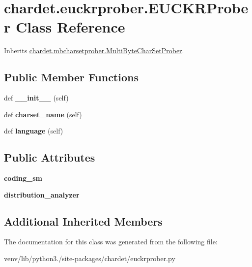 \hypertarget{classchardet_1_1euckrprober_1_1_e_u_c_k_r_prober}{}\section{chardet.\+euckrprober.\+E\+U\+C\+K\+R\+Prober Class Reference}
\label{classchardet_1_1euckrprober_1_1_e_u_c_k_r_prober}


Inherits \hyperlink{classchardet_1_1mbcharsetprober_1_1_multi_byte_char_set_prober}{chardet.\+mbcharsetprober.\+Multi\+Byte\+Char\+Set\+Prober}.

\subsection*{Public Member Functions}
\begin{DoxyCompactItemize}
\item 
\mbox{\label{classchardet_1_1euckrprober_1_1_e_u_c_k_r_prober_a06395787496827f7ba6ddada2690c4c9}} 
def {\bfseries \+\_\+\+\_\+init\+\_\+\+\_\+} (self)
\item 
\mbox{\label{classchardet_1_1euckrprober_1_1_e_u_c_k_r_prober_aa3a103f72390e45d4d496a227e171894}} 
def {\bfseries charset\+\_\+name} (self)
\item 
\mbox{\label{classchardet_1_1euckrprober_1_1_e_u_c_k_r_prober_a5530dadf3b58280e47b3af8d7fcc7471}} 
def {\bfseries language} (self)
\end{DoxyCompactItemize}
\subsection*{Public Attributes}
\begin{DoxyCompactItemize}
\item 
\mbox{\label{classchardet_1_1euckrprober_1_1_e_u_c_k_r_prober_a264e9b82c9d750beac1d24081bd80115}} 
{\bfseries coding\+\_\+sm}
\item 
\mbox{\label{classchardet_1_1euckrprober_1_1_e_u_c_k_r_prober_a17e26c29ce0cc762de888c244af1ad21}} 
{\bfseries distribution\+\_\+analyzer}
\end{DoxyCompactItemize}
\subsection*{Additional Inherited Members}


The documentation for this class was generated from the following file\+:\begin{DoxyCompactItemize}
\item 
venv/lib/python3./site-\/packages/chardet/euckrprober.\+py\end{DoxyCompactItemize}
